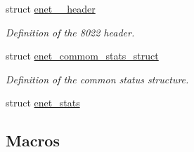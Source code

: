 \begin{DoxyCompactItemize}
struct \hyperlink{structenet__8022__header}{enet\+\_\+\_\+header}
\begin{DoxyCompactList}\small\item\em Definition of the 8022 header. \end{DoxyCompactList}\item 
struct \hyperlink{structenet__commom__stats__struct}{enet\+\_\+commom\+\_\+stats\+\_\+struct}
\begin{DoxyCompactList}\small\item\em Definition of the common status structure. \end{DoxyCompactList}\item 
struct \hyperlink{structenet__stats}{enet\+\_\+stats}
\end{DoxyCompactItemize}
\subsection*{Macros}
